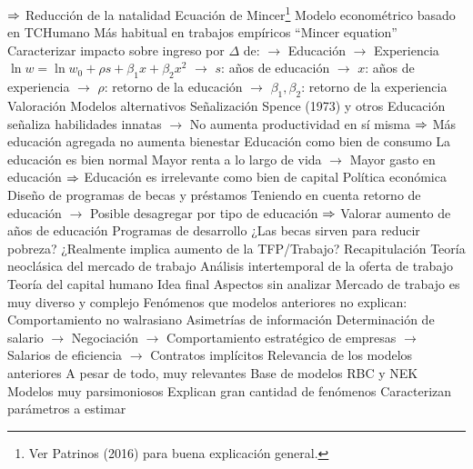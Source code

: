 \documentclass{nuevotema}
\begin{document}
\begin{esquemal}
				\4[] $\Rightarrow$ Reducción de la natalidad
			\3 Ecuación de Mincer\footnote{Ver Patrinos (2016) para buena explicación general.}
				\4 Modelo econométrico basado en TCHumano
				\4[] Más habitual en trabajos empíricos
				\4[] ``Mincer equation''
				\4[] Caracterizar impacto sobre ingreso por $\Delta$ de:
				\4[] $\to$ Educación
				\4[] $\to$ Experiencia
				\4[] $\ln w = \ln w_0 + \rho s + \beta_1 x + \beta_2 x^2$
				\4[] $\to$ $s$: años de educación
				\4[] $\to$ $x$: años de experiencia
				\4[] $\to$ $\rho$: retorno de la educación
				\4[] $\to$ $\beta_1, \beta_2$: retorno de la experiencia
		\2 Valoración
			\3 Modelos alternativos
				\4 Señalización
				\4[] Spence (1973) y otros
				\4[] Educación señaliza habilidades innatas
				\4[] $\to$ No aumenta productividad en sí misma
				\4[] $\Rightarrow$ Más educación agregada no aumenta bienestar
				\4 Educación como bien de consumo
				\4[] La educación es bien normal
				\4[] Mayor renta a lo largo de vida
				\4[] $\to$ Mayor gasto en educación
				\4[] $\Rightarrow$ Educación es irrelevante como bien de capital
			\3 Política económica
				\4 Diseño de programas de becas y préstamos
				\4[] Teniendo en cuenta retorno de educación
				\4[] $\to$ Posible desagregar por tipo de educación
				\4[] $\Rightarrow$ Valorar aumento de años de educación
				\4 Programas de desarrollo
				\4[] ¿Las becas sirven para reducir pobreza?
				\4[] ¿Realmente implica aumento de la TFP/Trabajo?
	\1 
		\2 Recapitulación
			\3 Teoría neoclásica del mercado de trabajo
			\3 Análisis intertemporal de la oferta de trabajo
			\3 Teoría del capital humano
		\2 Idea final
			\3 Aspectos sin analizar
				\4 Mercado de trabajo es muy diverso y complejo
				\4 Fenómenos que modelos anteriores no explican:
				\4[] Comportamiento no walrasiano
				\4[] Asimetrías de información
				\4[] Determinación de salario
				\4[] $\to$ Negociación
				\4[] $\to$ Comportamiento estratégico de empresas
				\4[] $\to$ Salarios de eficiencia
				\4[] $\to$ Contratos implícitos
			\3 Relevancia de los modelos anteriores
				\4 A pesar de todo, muy relevantes
				\4 Base de modelos RBC y NEK
				\4 Modelos muy parsimoniosos
				\4 Explican gran cantidad de fenómenos
				\4 Caracterizan parámetros a estimar
\end{esquemal}
\end{document}

